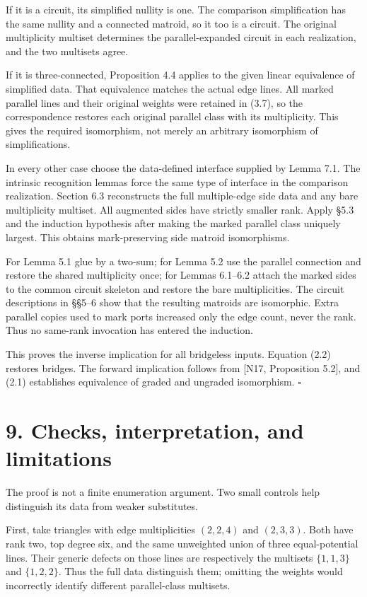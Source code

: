 \documentclass[11pt]{article}
\begin{document}
If it is a circuit, its simplified nullity is one. The comparison simplification has the same nullity and a connected matroid, so it too is a circuit. The original multiplicity multiset determines the parallel-expanded circuit in each realization, and the two multisets agree.

If it is three-connected, Proposition 4.4 applies to the given linear equivalence of simplified data. That equivalence matches the actual edge lines. All marked parallel lines and their original weights were retained in (3.7), so the correspondence restores each original parallel class with its multiplicity. This gives the required isomorphism, not merely an arbitrary isomorphism of simplifications.

In every other case choose the data-defined interface supplied by Lemma 7.1. The intrinsic recognition lemmas force the same type of interface in the comparison realization. Section 6.3 reconstructs the full multiple-edge side data and any bare multiplicity multiset. All augmented sides have strictly smaller rank. Apply \S{}5.3 and the induction hypothesis after making the marked parallel class uniquely largest. This obtains mark-preserving side matroid isomorphisms.

For Lemma 5.1 glue by a two-sum; for Lemma 5.2 use the parallel connection and restore the shared multiplicity once; for Lemmas 6.1--6.2 attach the marked sides to the common circuit skeleton and restore the bare multiplicities. The circuit descriptions in \S{}\S{}5--6 show that the resulting matroids are isomorphic. Extra parallel copies used to mark ports increased only the edge count, never the rank. Thus no same-rank invocation has entered the induction.

This proves the inverse implication for all bridgeless inputs. Equation (2.2) restores bridges. The forward implication follows from [N17, Proposition 5.2], and (2.1) establishes equivalence of graded and ungraded isomorphism. \ensuremath{\square}

\section*{9. Checks, interpretation, and limitations}

The proof is not a finite enumeration argument. Two small controls help distinguish its data from weaker substitutes.

First, take triangles with edge multiplicities $(2,2,4)$ and $(2,3,3)$. Both have rank two, top degree six, and the same unweighted union of three equal-potential lines. Their generic defects on those lines are respectively the multisets $\{1,1,3\}$ and $\{1,2,2\}$. Thus the full data distinguish them; omitting the weights would incorrectly identify different parallel-class multisets.
\end{document}
